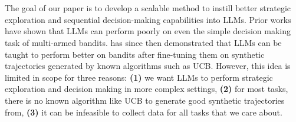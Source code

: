 \begin{table}[h]
    \caption{\footnotesize Summary of the task groups used by \ours{}. }
    \label{tab:environment_summary}
    \centering
    \vspace{-0.3cm}
\end{table}

\section{\ours{}}

The goal of our paper is to develop a scalable method to instill better strategic exploration and sequential decision-making capabilities into LLMs. Prior works~\citep{krishnamurthy2024largelanguagemodelsexplore} have shown that LLMs can perform poorly on even the simple decision making task of multi-armed bandits. \citet{nie2024evolveevaluatingoptimizingllms} has since then demonstrated that LLMs can be taught to perform better on bandits after fine-tuning them on synthetic trajectories generated by known algorithms such as UCB. However, this idea is limited in scope for three reasons: \textbf{(1)} we want LLMs to perform strategic exploration and decision making in more complex settings, \textbf{(2)} for most tasks, there is no known algorithm like UCB to generate good synthetic trajectories from, \textbf{(3)} it can be infeasible to collect data for all tasks that we care about.

